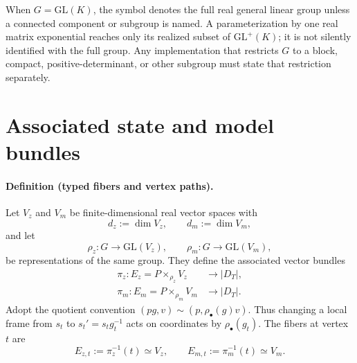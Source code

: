 When $G=\mathrm{GL}(K)$, the symbol denotes the full real general linear group unless a connected component or subgroup is named.  A parameterization by one real matrix exponential reaches only its realized subset of $\mathrm{GL}^{+}(K)$; it is not silently identified with the full group.  Any implementation that restricts $G$ to a block, compact, positive-determinant, or other subgroup must state that restriction separately.

\section{Associated state and model bundles}

\paragraph{Definition (typed fibers and vertex paths).}
Let $V_z$ and $V_m$ be finite-dimensional real vector spaces with
\begin{equation}
d_z:=\dim V_z,
\qquad
d_m:=\dim V_m,
\label{eq:fiber-dimensions}
\end{equation}
and let
\begin{equation}
\rho_z:G\longrightarrow \mathrm{GL}(V_z),
\qquad
\rho_m:G\longrightarrow \mathrm{GL}(V_m),
\label{eq:shared-group-representations}
\end{equation}
be representations of the same group.  They define the associated vector bundles
\begin{equation}
\begin{aligned}
\pi_z:E_z=P\times_{\rho_z}V_z&\longrightarrow |D_T|,\\
\pi_m:E_m=P\times_{\rho_m}V_m&\longrightarrow |D_T|.
\end{aligned}
\label{eq:associated-state-model-bundles}
\end{equation}
Adopt the quotient convention $(p g,v)\sim(p,\rho_\bullet(g)v)$.  Thus changing a local frame from $s_t$ to $s_t'=s_tg_t^{-1}$ acts on coordinates by $\rho_\bullet(g_t)$.  The fibers at vertex $t$ are
\begin{equation}
E_{z,t}:=\pi_z^{-1}(t)\simeq V_z,
\qquad
E_{m,t}:=\pi_m^{-1}(t)\simeq V_m.
\label{eq:vertex-fibers}
\end{equation}


